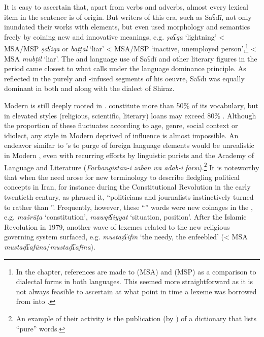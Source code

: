 \documentclass[output=paper]{langsci/langscibook}
\begin{document}
It is easy to ascertain that, apart from verbs and adverbs, almost every lexical item in the sentence is of  origin. But writers of this era, such as Saʕdī, not only inundated their works with  elements, but even used  morphology and semantics freely by coining new and innovative meanings, e.g. \textit{ṣaʕqa} ‘lightning’ < MSA/MSP \textit{ṣāʕiqa} or \textit{baṭṭāl} ‘liar’ < MSA/MSP ‘inactive, unemployed person’,\footnote{In the chapter, references are made to   (MSA) and   (MSP) as a comparison to dialectal forms in both languages. This seemed more straightforward as it is not always feasible to ascertain at what point in time a lexeme was borrowed from  into .} < MSA \textit{mubṭil} ‘liar’. The  and  language use of Saʕdī and other literary figures in the   period came closest to what \citet{Lucas2015} calls  under the language dominance principle. As reflected in the purely  and -infused  segments of his oeuvre, Saʕdī was equally dominant in both   and   along with the dialect of Shiraz.

Modern  is still deeply rooted in .   constitute more than 50\% of its vocabulary, but in elevated styles (religious, scientific, literary)  loans may exceed 80\% \citep{Jeremiás2011}. Although the proportion of these  fluctuates according to age, genre, social context or idiolect, any style in Modern  deprived of  influence is almost impossible. An endeavor similar to ’s to purge  of foreign language elements would be unrealistic in Modern , even with recurring efforts by linguistic purists and the Academy of  Language and Literature (\textit{Farhangistān-i} \textit{zabān} \textit{wa} \textit{adab-i} \textit{fārsī}).\footnote{An example of their activity is the publication (by \citealt{Rāzī2004}) of a dictionary that lists “pure”  words.} It is noteworthy that when the need arose for new terminology to describe fledgling political concepts in Iran, for instance during the Constitutional Revolution in the early twentieth\textsuperscript{} century, as \citet{Elwell-Sutton2000} phrased it, “politicians and journalists instinctively turned to  rather than ”. Frequently, however, these “” words were new coinages in the , e.g. \textit{mašrūṭa} ‘constitution’, \textit{mawqiʕiyyat} ‘situation, position’. After the Islamic Revolution in 1979, another wave of  lexemes related to the new religious governing system surfaced, e.g. \textit{mustaẓʕifīn} ‘the needy, the enfeebled’ (< MSA \textit{mustaḍʕafūna}\kern 0.5pt/\kern -1pt\textit{mustaḍʕafīna}).
\end{document}
